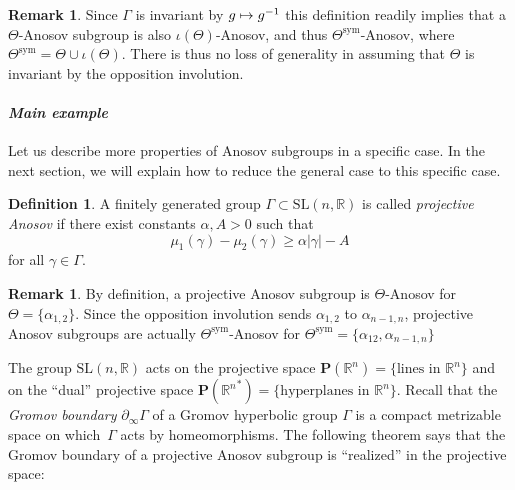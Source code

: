 \documentclass[11pt]{article}
\numberwithin{equation}{section}
\newcommand{\sym}{\mathrm{sym}}
\newcommand\mto{\mathchoice{\longmapsto}{\mapsto}{\mapsto}{\mapsto}}
\theoremstyle{definition}
\newtheorem{defi}[theo]{Definition}
\newtheorem{rmk}[theo]{Remark}
\newcommand{\proj}{\mathbf{P}}
\newcommand{\R}{\mathbb{R}}
\newcommand{\SL}{\mathrm{SL}}
\let\op\iota
\let\G\Gamma
\let\g\gamma
\begin{document}
\begin{rmk}
Since $\Gamma$ is invariant by $g\mto g^{-1}$ this definition readily implies that a $\Theta$-Anosov subgroup is also $\op(\Theta)$-Anosov, and thus $\Theta^{\sym}$-Anosov, where $\Theta^{\sym} = \Theta \cup \op(\Theta)$. There is thus no loss of generality in assuming that $\Theta$ is invariant by the opposition involution.
\end{rmk}

\paragraph{{\it Main example}}

Let us describe more properties of Anosov subgroups in a specific case. In the next section, we will explain how to reduce the general case to this specific case.
\begin{defi}
A finitely generated group $\G \subset \SL(n,\R)$ is called \emph{projective Anosov} if there exist constants $\alpha, A>0$ such that\vspace*{-3pt}
\[\mu_1(\g) - \mu_2(\g) \geq \alpha \vert \g \vert - A\]
for all $\g\in \G$.
\end{defi}

\begin{rmk}
By definition, a projective Anosov subgroup is $\Theta$-Anosov for $\Theta =\{\alpha_{1,2}\}$. Since the opposition involution sends $\alpha_{1,2}$ to $\alpha_{n-1, n}$, projective Anosov subgroups are actually $\Theta^{\sym}$-Anosov for $\Theta^{\sym} =\{\alpha_{12}, \alpha_{n-1,n}\}$
\end{rmk}

The group $\SL(n,\R)$ acts on the projective space $\proj(\R^n) = \{\textrm{lines in }\R^n\}$ and on the ``dual'' projective space $\proj({\R^n}^*)= \{\textrm{hyperplanes in }\R^n\}$. Recall that the \emph{Gromov boundary} $\partial_\infty \G$ of a Gromov hyperbolic group $\G$ is a compact metrizable space on which~$\G$ acts by homeomorphisms. The following theorem says that the Gromov boundary of a projective Anosov subgroup is ``realized'' in the projective space:
\end{document}
